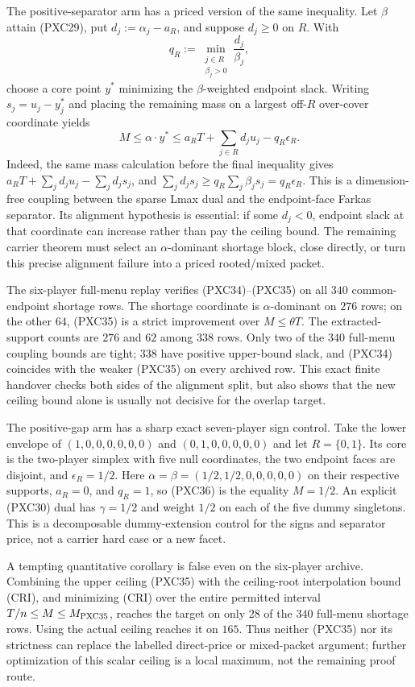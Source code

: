 \documentclass[11pt]{article}
\begin{document}
The positive-separator arm has a priced version of the same inequality.  Let
$\beta$ attain (PXC29), put $d_j:=\alpha_j-a_R$, and suppose
$d_j\ge0$ on $R$.  With
\[
 q_R:=\min_{\substack{j\in R\\\beta_j>0}}
              \frac{d_j}{\beta_j},
\]
choose a core point $y^*$ minimizing the $\beta$-weighted endpoint slack.
Writing $s_j=u_j-y^*_j$ and placing the remaining mass on a largest
off-$R$ over-cover coordinate yields
\[
 M\le\alpha\cdot y^*
 \le a_RT+\sum_{j\in R}d_ju_j-q_R\epsilon_R.         \tag{PXC36}
\]
Indeed, the same mass calculation before the final inequality gives
$a_RT+\sum_jd_ju_j-\sum_jd_js_j$, and
$\sum_jd_js_j\ge q_R\sum_j\beta_js_j=q_R\epsilon_R$.
This is a dimension-free coupling between the sparse Lmax dual and the
endpoint-face Farkas separator.  Its alignment hypothesis is essential: if
some $d_j<0$, endpoint slack at that coordinate can increase rather than pay
the ceiling bound.  The remaining carrier theorem must select an
$\alpha$-dominant shortage block, close directly, or turn this precise
alignment failure into a priced rooted/mixed packet.

The six-player full-menu replay verifies (PXC34)--(PXC35) on all $340$
common-endpoint shortage rows.  The shortage coordinate is
$\alpha$-dominant on $276$ rows; on the other $64$, (PXC35) is a strict
improvement over $M\le\theta T$.  The extracted-support counts are $276$ and
$62$ among $338$ rows.  Only two of the $340$ full-menu coupling bounds are
tight; $338$ have positive upper-bound slack, and (PXC34) coincides with the
weaker (PXC35) on every archived row.  This exact finite handover checks both
sides of the alignment split, but also shows that the new ceiling bound alone
is usually not decisive for the overlap target.

The positive-gap arm has a sharp exact seven-player sign control.  Take the
lower envelope of $(1,0,0,0,0,0,0)$ and
$(0,1,0,0,0,0,0)$ and let $R=\{0,1\}$.  Its core is the two-player simplex
with five null coordinates, the two endpoint faces are disjoint, and
$\epsilon_R=1/2$.  Here
$\alpha=\beta=(1/2,1/2,0,0,0,0,0)$ on their respective supports,
$a_R=0$, and $q_R=1$, so (PXC36) is the equality $M=1/2$.  An explicit
(PXC30) dual has $\gamma=1/2$ and weight $1/2$ on each of the five dummy
singletons.  This is a decomposable dummy-extension control for the signs
and separator price, not a carrier hard case or a new facet.

A tempting quantitative corollary is false even on the six-player archive.
Combining the upper ceiling (PXC35) with the ceiling-root interpolation bound
(CRI), and minimizing (CRI) over the entire permitted interval
$T/n\le M\le M_{\rm PXC35}$, reaches the target on only $28$ of the $340$
full-menu shortage rows.  Using the actual ceiling reaches it on $165$.
Thus neither (PXC35) nor its strictness can replace the labelled direct-price
or mixed-packet argument; further optimization of this scalar ceiling is a
local maximum, not the remaining proof route.
\end{document}
